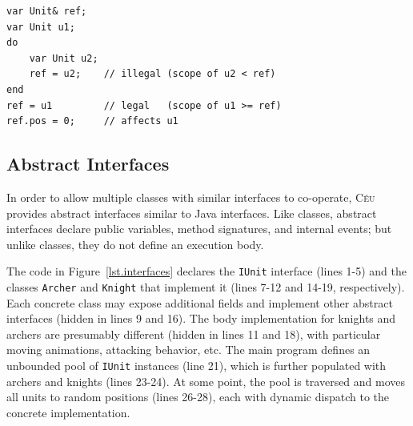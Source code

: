 \documentclass{sigplanconf}
\newcommand{\CEU}{\textsc{C\'{e}u}\xspace}
\newcommand{\code}[1] {{\small{\texttt{#1}}}}
\newcommand{\1}{\;}
\newcommand{\2}{\;\;}
\newcommand{\3}{\;\;\;}
\newcommand{\5}{\;\;\;\;\;}
\begin{document}
\begin{lstlisting}
var Unit& ref;
var Unit u1;
do
    var Unit u2;
    ref = u2;    // illegal (scope of u2 < ref)
end
ref = u1         // legal   (scope of u1 >= ref)
ref.pos = 0;     // affects u1
\end{lstlisting}

\subsection{Abstract Interfaces}

In order to allow multiple classes with similar interfaces to co-operate, \CEU 
provides abstract interfaces similar to Java interfaces.
%
Like classes, abstract interfaces declare public variables, method signatures, 
and internal events; but unlike classes, they do not define an execution body.

The code in Figure~\ref{lst.interfaces} declares the \code{IUnit} interface 
(lines 1-5) and the classes \code{Archer} and \code{Knight} that implement it 
(lines 7-12 and 14-19, respectively).
%
Each concrete class may expose additional fields and implement other abstract 
interfaces (hidden in lines 9 and 16).
%
The body implementation for knights and archers are presumably different 
(hidden in lines 11 and 18), with particular moving animations, attacking 
behavior, etc.
%
The main program defines an unbounded pool of \code{IUnit} instances (line 21), 
which is further populated with archers and knights (lines 23-24).
At some point, the pool is traversed and moves all units to random positions 
(lines 26-28), each with dynamic dispatch to the concrete implementation.
\end{document}
